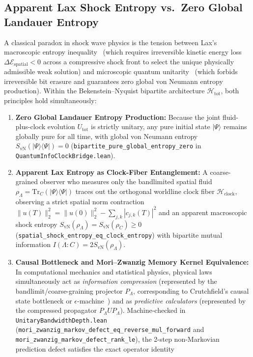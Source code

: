 \documentclass[11pt,a4paper]{article}
\theoremstyle{definition}
\begin{document}
\subsection{Apparent Lax Shock Entropy vs.\ Zero Global Landauer Entropy}
\label{subsec:lax-entropy-paradox}
A classical paradox in shock wave physics is the tension between Lax's macroscopic entropy inequality~\cite{lax1973} (which requires irreversible kinetic energy loss $\Delta\mathcal{E}_{\text{spatial}} < 0$ across a compressive shock front to select the unique physically admissible weak solution) and microscopic quantum unitarity~\cite{landauer1961,bennett1973} (which forbids irreversible bit erasure and guarantees zero global von Neumann entropy production).
Within the Bekenstein--Nyquist bipartite architecture $\mathcal{H}_{\text{tot}}$, both principles hold simultaneously:
\begin{enumerate}
\item \textbf{Zero Global Landauer Entropy Production:} Because the joint fluid-plus-clock evolution $U_{\text{tot}}$ is strictly unitary, any pure initial state $|\Psi\rangle$ remains globally pure for all time, with global von Neumann entropy $S_{\text{vN}}(|\Psi\rangle\langle\Psi|) = 0$ (\texttt{bipartite\_\allowbreak{}pure\_\allowbreak{}global\_\allowbreak{}entropy\_\allowbreak{}zero} in \texttt{QuantumInfo\allowbreak{}Clock\allowbreak{}Bridge.lean}).
\item \textbf{Apparent Lax Entropy as Clock-Fiber Entanglement:} A coarse-grained observer who measures only the bandlimited spatial fluid $\rho_{\Lambda} = \mathrm{Tr}_C(|\Psi\rangle\langle\Psi|)$ traces out the orthogonal worldline clock fiber $\mathcal{H}_{\text{clock}}$, observing a strict spatial norm contraction $\|u(T)\|_2^2 = \|u(0)\|_2^2 - \sum_{j,k} |c_{j,k}(T)|^2$ and an apparent macroscopic shock entropy $S_{\text{vN}}(\rho_{\Lambda}) = S_{\text{vN}}(\rho_C) \ge 0$ (\texttt{spatial\_\allowbreak{}shock\_\allowbreak{}entropy\_\allowbreak{}eq\_\allowbreak{}clock\_\allowbreak{}entropy}) with bipartite mutual information $I(\Lambda : C) = 2 S_{\text{vN}}(\rho_{\Lambda})$.
\item \textbf{Causal Bottleneck and Mori--Zwanzig Memory Kernel Equivalence:} In computational mechanics and statistical physics, physical laws simultaneously act as \emph{information compression} (represented by the bandlimit/coarse-graining projector $P_{\Lambda}$, corresponding to Crutchfield's causal state bottleneck or $\epsilon$-machine~\cite{crutchfield1989,gu2012}) and as \emph{predictive calculators} (represented by the compressed propagator $P_{\Lambda} U P_{\Lambda}$). Machine-checked in \texttt{Unitary\allowbreak{}Bandwidth\allowbreak{}Depth.lean} (\texttt{mori\_\allowbreak{}zwanzig\_\allowbreak{}markov\_\allowbreak{}defect\_\allowbreak{}eq\_\allowbreak{}reverse\_\allowbreak{}mul\_\allowbreak{}forward} and \texttt{mori\_\allowbreak{}zwanzig\_\allowbreak{}markov\_\allowbreak{}defect\_\allowbreak{}rank\_\allowbreak{}le}), the 2-step non-Markovian prediction defect satisfies the exact operator identity

\end{enumerate}
\end{document}
